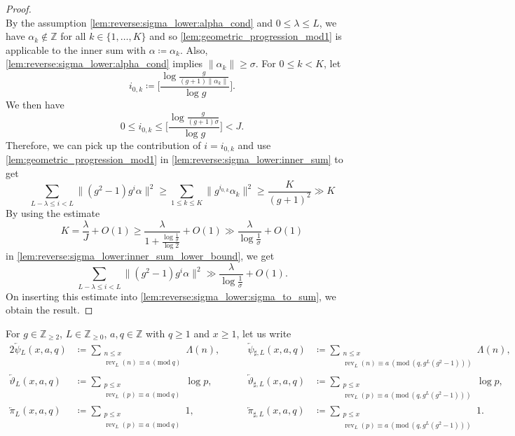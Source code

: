 \documentclass[hidelinks]{amsart}
\numberwithin{equation}{section}
\theoremstyle{plain}
\theoremstyle{definition}
\renewcommand{\mod}[1]{(\mathrm{mod}\ #1)}
\DeclareMathOperator{\rev}{rev}
\newcommand{\arev}{\overleftarrow}
\begin{document}
\begin{proof}
\begin{equation}
\end{equation}
By the assumption \cref{lem:reverse:sigma_lower:alpha_cond} and $0\le\lambda\le L$,
we have $\alpha_{k}\not\in\mathbb{Z}$ for all $k\in\{1,\ldots,K\}$
and so \cref{lem:geometric_progression_mod1}
is applicable to the inner sum with $\alpha\coloneqq\alpha_{k}$.
Also, \cref{lem:reverse:sigma_lower:alpha_cond} implies $\|\alpha_{k}\|\ge\sigma$.
For $0\le k<K$, let
\[
i_{0,k}
\coloneqq
\biggl[\frac{\log\frac{g}{(g+1)\|\alpha_{k}\|}}{\log g}\biggr].
\]
We then have
\[
0\le i_{0,k}\le\biggl[\frac{\log\frac{g}{(g+1)\sigma}}{\log g}\biggr]<J.
\]
Therefore, we can pick up the contribution of $i=i_{0,k}$
and use \cref{lem:geometric_progression_mod1} in \cref{lem:reverse:sigma_lower:inner_sum} to get
\begin{equation}
\label{lem:reverse:sigma_lower:inner_sum_lower_bound}
\sum_{L-\lambda\le i<L}
\|(g^{2}-1)g^{i}\alpha\|^{2}
\ge
\sum_{1\le k\le K}
\|g^{i_{0,k}}\alpha_{k}\|^{2}
\ge
\frac{K}{(g+1)^{2}}
\gg
K
\end{equation}
By using the estimate
\[
K
=
\frac{\lambda}{J}+O(1)
\ge
\frac{\lambda}{1+\frac{\log\frac{1}{\sigma}}{\log 2}}
+O(1)
\gg
\frac{\lambda}{\log\frac{1}{\sigma}}
+O(1)
\]
in \cref{lem:reverse:sigma_lower:inner_sum_lower_bound}, we get
\[
\sum_{L-\lambda\le i<L}
\|(g^{2}-1)g^{i}\alpha\|^{2}
\gg
\frac{\lambda}{\log\frac{1}{\sigma}}
+
O(1).
\]
On inserting this estimate into \cref{lem:reverse:sigma_lower:sigma_to_sum},
we obtain the result.
\end{proof}

For $g\in\mathbb{Z}_{\ge2}$, $L\in\mathbb{Z}_{\ge0}$, $a,q\in\mathbb{Z}$
with $q\ge1$ and $x\ge1$, let us write
\begin{alignat}{2}
\arev{\psi}\!_{L}(x,a,q)
&\coloneqq
\sum_{\substack{
n\le x\\
\rev_{L}(n)\equiv a\ \mod{q}
}}
\Lambda(n),\qquad
&\arev{\psi}\!_{\sharp,L}(x,a,q)
&\coloneqq
\sum_{\substack{
n\le x\\
\rev_{L}(n)\equiv a\ \mod{(q,g^{L}(g^{2}-1))}
}}
\Lambda(n),\\
\arev{\vartheta}\!_{L}(x,a,q)
&\coloneqq
\sum_{\substack{
p\le x\\
\rev_{L}(p)\equiv a\ \mod{q}
}}
\log p,\qquad
&\arev{\vartheta}\!_{\sharp,L}(x,a,q)
&\coloneqq
\sum_{\substack{
p\le x\\
\rev_{L}(p)\equiv a\ \mod{(q,g^{L}(g^{2}-1))}
}}
\log p,\\
\arev{\pi}\!_{L}(x,a,q)
&\coloneqq
\sum_{\substack{
p\le x\\
\rev_{L}(p)\equiv a\ \mod{q}
}}
1,\qquad
&\arev{\pi}\!_{\sharp,L}(x,a,q)
&\coloneqq
\sum_{\substack{
p\le x\\
\rev_{L}(p)\equiv a\ \mod{(q,g^{L}(g^{2}-1))}
}}
1.
\end{alignat}
\end{document}
